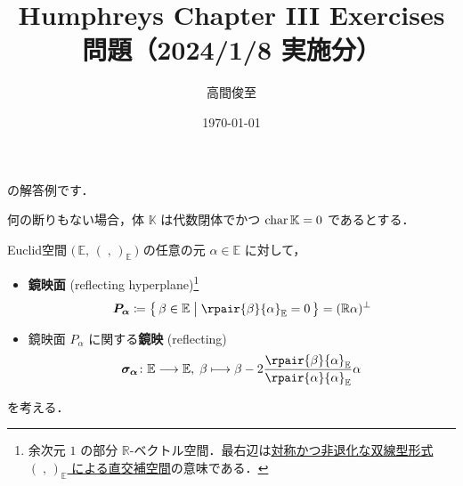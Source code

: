 \documentclass{ltjsarticle}
\theoremstyle{mystyle} %
\numberwithin{equation}{section}
\newcommand{\lto}{\longrightarrow}
\newcommand{\lmto}{\longmapsto}
\newcommand{\Euc}[1]{\bigl(\, #1,\, (\;,\,)_{#1}\,\bigr)}
\begin{document}
\title{Humphreys Chapter III Exercises \\ 問題（2024/1/8 実施分）}
\author{高間俊至}
\date{\today}
\maketitle

\setcounter{section}{6}

\cite[p.63, Exercise1, 3]{Humphreys1972introduction}
の解答例です．

何の断りもない場合，体 $\mathbb{K}$ は代数閉体でかつ $\operatorname{char} \mathbb{K} = 0$ であるとする．


Euclid空間 $\Euc{\mathbb{E}}$ の任意の元 $\alpha \in \mathbb{E}$ に対して，
\begin{itemize}
    \item \textbf{鏡映面} (reflecting hyperplane)\footnote{余次元 $1$ の部分 $\mathbb{R}$-ベクトル空間．最右辺は\hyperref[def:radical-bilinear]{対称かつ非退化な双線型形式 $(\;,\,)_{\mathbb{E}}$ による直交補空間}の意味である．}
    \begin{align}
        \label{def:hyperplane}
        \bm{P_\alpha} \coloneqq \bigl\{\, \beta \in \mathbb{E} \bigm| \rpair{\beta}{\alpha}_{\mathbb{E}} = 0 \,\bigr\} = (\mathbb{R}\alpha)^\perp
    \end{align}
    \item 鏡映面 $P_\alpha$ に関する\textbf{鏡映} (reflecting)
    \begin{align}
        \bm{\sigma_\alpha} \colon \mathbb{E} \lto \mathbb{E},\; \beta \lmto \beta - 2 \frac{\rpair{\beta}{\alpha}_{\mathbb{E}}}{\rpair{\alpha}{\alpha}_{\mathbb{E}}} \alpha
    \end{align}
\end{itemize}
を考える．
\end{document}
